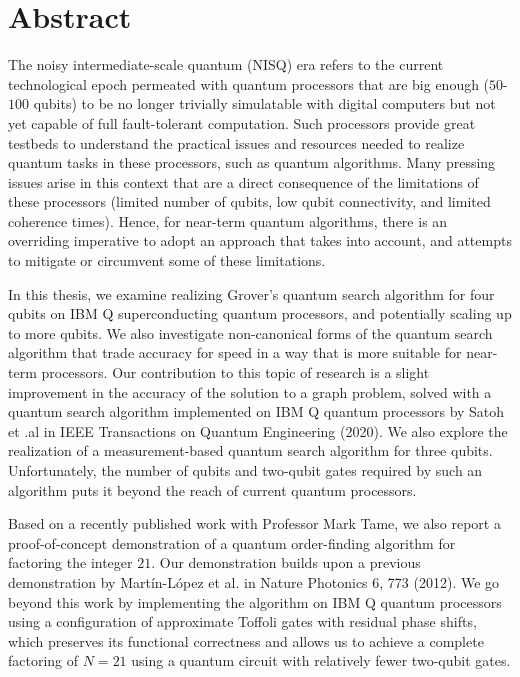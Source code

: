 \chapter*{Abstract}
The noisy intermediate-scale quantum (NISQ) era refers to the current technological epoch permeated with quantum processors that are big enough ($50$-$100$ qubits) to be no longer trivially simulatable with digital computers but not yet capable of full fault-tolerant computation. Such processors provide great testbeds to understand the practical issues and resources needed to realize quantum tasks in these processors, such as quantum algorithms. Many pressing issues arise in this context that are a direct consequence of the limitations of these processors (limited number of qubits, low qubit connectivity, and limited coherence times). Hence, for near-term quantum algorithms, there is an overriding imperative to adopt an approach that takes into account, and attempts to mitigate or circumvent some of these limitations.

\bigskip
\noindent
In this thesis, we examine realizing Grover's quantum search algorithm for four qubits on IBM Q superconducting quantum processors, and potentially scaling up to more qubits. We also investigate non-canonical forms of the quantum search algorithm that trade accuracy for speed in a way that is more suitable for near-term processors. Our contribution to this topic of research is a slight improvement in the accuracy of the solution to a graph problem, solved with a quantum search algorithm implemented on IBM Q quantum processors by Satoh et .al in IEEE Transactions on Quantum Engineering (2020). We also explore the realization of a measurement-based quantum search algorithm for three qubits. Unfortunately, the number of qubits and two-qubit gates required by such an algorithm puts it beyond the reach of current quantum processors.

\bigskip
\noindent
Based on a recently published work with Professor Mark Tame, we also report a proof-of-concept demonstration of a quantum order-finding algorithm for factoring the integer $21$. Our demonstration builds upon a previous demonstration by Mart\'in-L\'{o}pez et al. in Nature Photonics 6, 773 (2012). We go beyond this work by implementing the algorithm on IBM Q quantum processors using a configuration of approximate Toffoli gates with residual phase shifts, which preserves its functional correctness and allows us to achieve a complete factoring of $N=21$ using a quantum circuit with relatively fewer two-qubit gates. 


